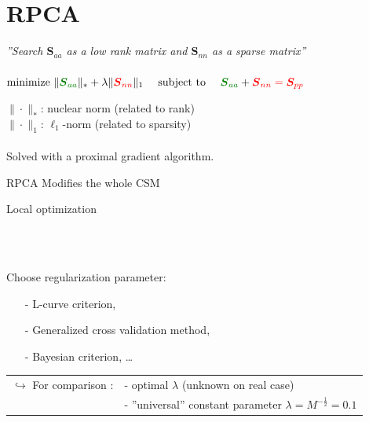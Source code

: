 \documentclass[8pt,xcolor=x11names,compress, notes=show]{beamer}%
\newcommand{\citeTransp}[1]{\color{fg!50} \citep{#1}}
\begin{document}
\section{RPCA}
\begin{frame}
\end{frame}
\begin{frame}{\insertsectionhead}
	\vspace{-0.5cm}
	\begin{center}
		\textit{''Search $\bm{S}_{aa}$ as a low rank matrix and $\bm{S}_{nn}$ as a sparse matrix''}\\~\\
		\colorbox{gray!20}{
		 $\text{minimize~} \|\textcolor{green}{\bm{{S}}_{aa}} \|_* + \lambda \| \textcolor{red}{\bm{{S}}_{nn}} \|_1  \text{~~~~subject to~~~~} \textcolor{green}{ \bm{{S}}_{aa}} +  \textcolor{red}{\bm{{S}}_{nn} = \bm{S}_{pp}}$
		}
	\end{center}


	
	$\| \cdot \|_*$: nuclear norm (related to rank)\\
	$\| \cdot \|_1$: $\ell_1$-norm (related to sparsity)\\~\\
	
	Solved with a proximal gradient algorithm.
	\vfill

	\begin{block}{RPCA  \citeTransp{Wright2009a}}
		 Modifies the whole CSM		\hfill\parbox{0.57\linewidth}{ Local optimization}\\[2pt]
		~\hfill\parbox{0.57\linewidth}{ Choose regularization parameter:
		\small
		\begin{itemize}
			\setlength{\itemindent}{0.3cm}
		        \item[-] L-curve criterion,\\[-2pt]
		        \item[-] Generalized cross validation method,\\[-2pt]
		       \item[-] Bayesian criterion, \dots
		\end{itemize}
		}
	\end{block}
	\vfill
	\begin{tabular}{rl}
	$\hookrightarrow$ For comparison :& - optimal $\lambda$  (unknown on real case)\\
	& - ''universal'' constant  parameter $\lambda=M^{-\frac{1}{2}}=0.1$
	\end{tabular}

\end{frame}
\end{document}
